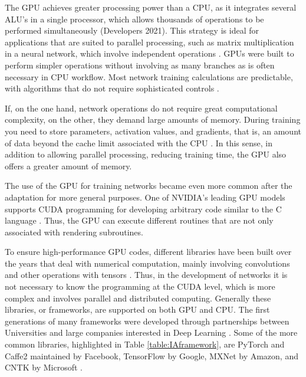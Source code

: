 The GPU achieves greater processing power than a CPU, as it integrates several ALU's in a single processor, which allows thousands of operations to be performed simultaneously (Developers 2021). This strategy is ideal for applications that are suited to parallel processing, such as matrix multiplication in a neural network, which involve independent operations \cite{goodfellow2016}. GPUs were built to perform simpler operations without involving as many branches as is often necessary in CPU workflow. Most network training calculations are predictable, with algorithms that do not require sophisticated controls \cite{goodfellow2016}.

If, on the one hand, network operations do not require great computational complexity, on the other, they demand large amounts of memory. During training you need to store parameters, activation values, and gradients, that is, an amount of data beyond the cache limit associated with the CPU \cite{goodfellow2016}. In this sense, in addition to allowing parallel processing, reducing training time, the GPU also offers a greater amount of memory.

The use of the GPU for training networks became even more common after the adaptation for more general purposes. One of NVIDIA's leading GPU models supports CUDA programming for developing arbitrary code similar to the C language \cite{goodfellow2016}. Thus, the GPU can execute different routines that are not only associated with rendering subroutines.

To ensure high-performance GPU codes, different libraries have been built over the years that deal with numerical computation, mainly involving convolutions and other operations with tensors \cite{goodfellow2016}. Thus, in the development of networks it is not necessary to know the programming at the CUDA level, which is more complex and involves parallel and distributed computing. Generally these libraries, or frameworks, are supported on both GPU and CPU. The first generations of many frameworks were developed through partnerships between Universities and large companies interested in Deep Learning . Some of the more common libraries, highlighted in Table \ref{table:IAframework}, are PyTorch and Caffe2 maintained by Facebook, TensorFlow by Google, MXNet by Amazon, and CNTK by Microsoft \cite{johnson2019}.


